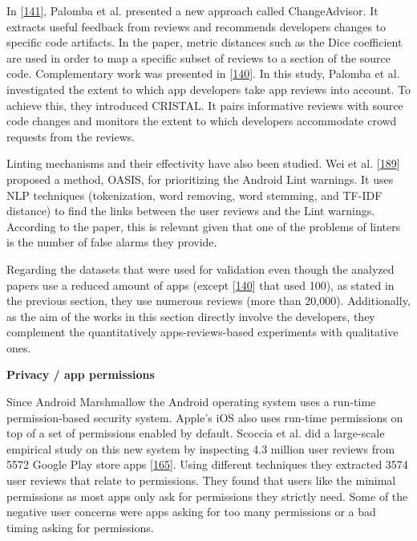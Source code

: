 \documentclass[]{book}
\begin{document}
In {[}\protect\hyperlink{ref-palomba2017recommending}{141}{]}, Palomba
et al. presented a new approach called ChangeAdvisor. It extracts useful
feedback from reviews and recommends developers changes to specific code
artifacts. In the paper, metric distances such as the Dice coefficient
are used in order to map a specific subset of reviews to a section of
the source code. Complementary work was presented in
{[}\protect\hyperlink{ref-palomba2018crowdsourcing}{140}{]}. In this
study, Palomba et al. investigated the extent to which app developers
take app reviews into account. To achieve this, they introduced CRISTAL.
It pairs informative reviews with source code changes and monitors the
extent to which developers accommodate crowd requests from the reviews.

Linting mechanisms and their effectivity have also been studied. Wei et
al. {[}\protect\hyperlink{ref-wei2017oasis}{189}{]} proposed a method,
OASIS, for prioritizing the Android Lint warnings. It uses NLP
techniques (tokenization, word removing, word stemming, and TF-IDF
distance) to find the links between the user reviews and the Lint
warnings. According to the paper, this is relevant given that one of the
problems of linters is the number of false alarms they provide.

Regarding the datasets that were used for validation even though the
analyzed papers use a reduced amount of apps (except
{[}\protect\hyperlink{ref-palomba2018crowdsourcing}{140}{]} that used
100), as stated in the previous section, they use numerous reviews (more
than 20,000). Additionally, as the aim of the works in this section
directly involve the developers, they complement the quantitatively
apps-reviews-based experiments with qualitative ones.

\textbf{Privacy / app permissions}

Since Android Marshmallow the Android operating system uses a run-time
permission-based security system. Apple's iOS also uses run-time
permissions on top of a set of permissions enabled by default. Scoccia
et al. did a large-scale empirical study on this new system by
inspecting 4.3 million user reviews from 5572 Google Play store apps
{[}\protect\hyperlink{ref-scoccia2018investigation}{165}{]}. Using
different techniques they extracted 3574 user reviews that relate to
permissions. They found that users like the minimal permissions as most
apps only ask for permissions they strictly need. Some of the negative
user concerns were apps asking for too many permissions or a bad timing
asking for permissions.
\end{document}
